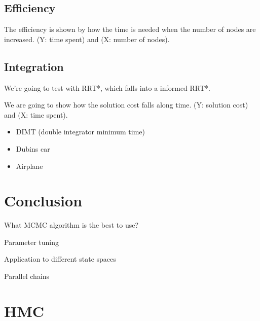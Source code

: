 \documentclass[letterpaper, 10 pt, conference]{ieeeconf}  %
\begin{document}
\subsection{Efficiency}

The efficiency is shown by how the time is needed when the number of nodes are increased.
(Y: time spent) and (X: number of nodes).

\subsection{Integration}

We're going to test with RRT*, which falls into a informed RRT*.

We are going to show how the solution cost falls along time.
(Y: solution cost) and (X: time spent).

\begin{itemize}
\item DIMT (double integrator minimum time)
\item Dubins car
\item Airplane
\end{itemize}

\section{Conclusion}

What MCMC algorithm is the best to use?

Parameter tuning

Application to different state spaces

Parallel chains

\appendix
\section{HMC}
\end{document}
